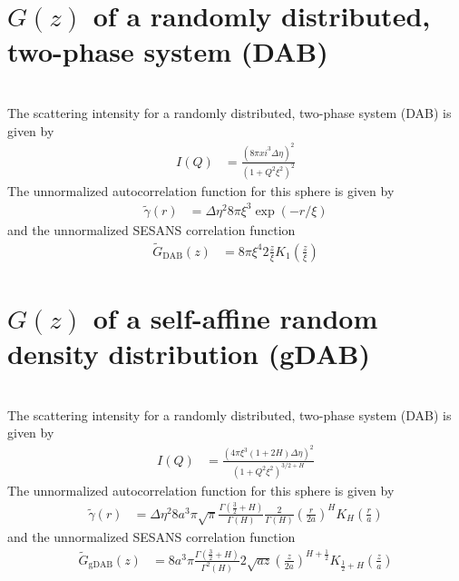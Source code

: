 \section{$G(z)$ of a randomly distributed, two-phase system (DAB) }~\\
The scattering intensity for a randomly distributed, two-phase system (DAB) is given by
\begin{align}
I(Q) &= \frac{\left(8 \pi xi^3 \Delta\eta\right)^2}{ \left(1+Q^2\xi^2\right)^2}
\end{align}
The unnormalized autocorrelation function for this sphere is given by
\begin{align}
\tilde{\gamma}(r) &=
 \Delta\eta^2 8\pi\xi^3 \exp\left( -r/\xi\right)
\end{align}
and the unnormalized SESANS correlation function
\begin{align}
\tilde{G}_\mathrm{DAB}(z)&= 8\pi\xi^4 2\frac{z}{\xi}K_1\left(\frac{z}{\xi}\right)
\end{align}

\section{$G(z)$ of a self-affine random density distribution (gDAB) }~\\
The scattering intensity for a randomly distributed, two-phase system (DAB) is given by
\begin{align}
I(Q) &= \frac{\left(4 \pi \xi^3 (1+2H) \Delta\eta\right)^2}{ \left(1+Q^2\xi^2\right)^{3/2+H}}
\end{align}
The unnormalized autocorrelation function for this sphere is given by
\begin{align}
\tilde{\gamma}(r) &=
 \Delta\eta^2 8a^3\pi\sqrt{\pi}\frac{\Gamma\left(\frac{3}{2}+H\right)}{\Gamma\left(H\right)}\frac{2}{\Gamma(H)}\left(\frac{r}{2a}\right)^H K_H\left(\frac{r}{a}\right)
\end{align}
and the unnormalized SESANS correlation function
\begin{align}
\tilde{G}_\mathrm{gDAB}(z)&=  8a^3\pi\frac{\Gamma\left(\frac{3}{2}+H\right)}{\Gamma^2\left(H\right)} 2\sqrt{az}\left(\frac{z}{2a}\right)^{H+\frac12}K_{\frac12+H}\left(\frac{z}{a}\right)
\end{align} 